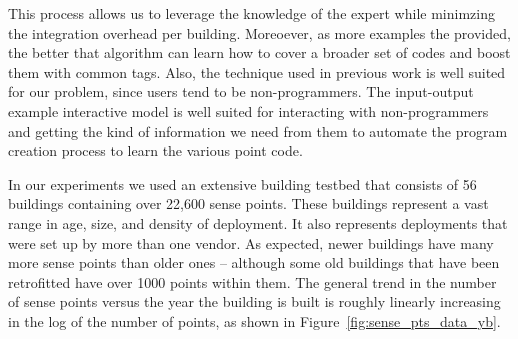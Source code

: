 This process allows us to leverage the knowledge of the expert while minimzing the integration
overhead per building.  Moreoever, as more examples the provided, the better that 
algorithm can learn how to cover a broader set of codes and boost them with common tags.
Also, the technique used in previous work is well suited for our problem, since
users tend to be non-programmers.  The input-output example interactive model is well suited
for interacting with non-programmers and getting the kind of information we need from them
to automate the program creation process to learn the various point code. 


In our experiments we used an extensive building testbed that 
consists of 56 buildings containing over 22,600 sense points. These buildings 
represent a vast range in age, size, and density of deployment.  It also represents deployments
that were set up by more than one vendor.  As expected, newer buildings have many more sense 
points than older ones -- although some old buildings that have been retrofitted have over 1000  
points within them. The general trend in the number of sense points versus the year the 
building is built is roughly linearly increasing in the log of the number of points, as shown
in Figure~\ref{fig:sense_pts_data_yb}.  

